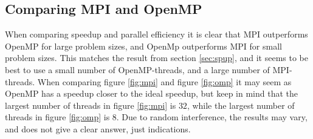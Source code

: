 \documentclass{article}
\begin{document}
\subsection{Comparing MPI and OpenMP}
When comparing speedup and parallel efficiency it is clear that MPI outperforms OpenMP for large problem sizes, and OpenMp outperforms MPI for small problem sizes. This matches the result from section \ref{sec:spup}, and it seems to be best to use a small number of OpenMP-threads, and a large number of MPI-threads. When comparing figure \ref{fig:mpi} and figure \ref{fig:omp} it may seem as OpenMP has a speedup closer to the ideal speedup, but keep in mind that the largest number of threads in figure \ref{fig:mpi} is $32$, while the largest number of threads in figure \ref{fig:omp} is $8$. Due to random interference, the results may vary, and does not give a clear answer, just indications.



\end{document}
